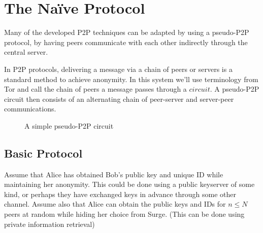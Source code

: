 \documentclass[twocolumn,11pt,english]{article}
\begin{document}
\section{The Na\"ive Protocol}
Many of the developed P2P techniques can be adapted by using a pseudo-P2P protocol, by having peers communicate with each other indirectly through the central server. 

In P2P protocols, delivering a message via a chain of peers or servers is a standard method to achieve anonymity. In this system we'll use terminology from Tor and call the chain of peers a message passes through a $circuit$. A pseudo-P2P circuit then consists of an alternating chain of peer-server and server-peer communications.

\begin{figure}[ht]
  \begin{center}
  \end{center}
  \caption{A simple pseudo-P2P circuit}
\end{figure}


\subsection{Basic Protocol}
Assume that Alice has obtained Bob's public key and unique ID while maintaining her anonymity. This could be done using a public keyserver of some kind, or perhaps they have exchanged keys in advance through some other channel. Assume also that Alice can obtain the public keys and IDs for $n \le N$ peers at random while hiding her choice from Surge. (This can be done using private information retrieval)
\end{document}
